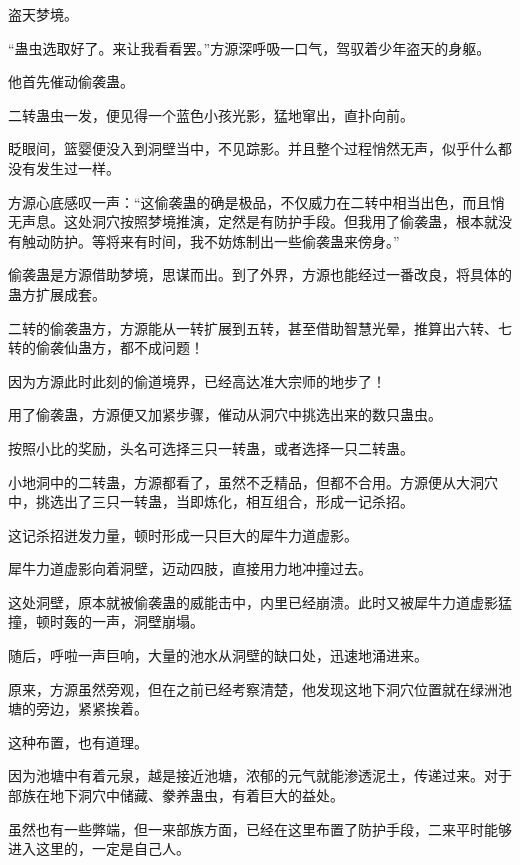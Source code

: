 
\begin{this_body}

盗天梦境。

“蛊虫选取好了。来让我看看罢。”方源深呼吸一口气，驾驭着少年盗天的身躯。

他首先催动偷袭蛊。

二转蛊虫一发，便见得一个蓝色小孩光影，猛地窜出，直扑向前。

眨眼间，篮婴便没入到洞壁当中，不见踪影。并且整个过程悄然无声，似乎什么都没有发生过一样。

方源心底感叹一声：“这偷袭蛊的确是极品，不仅威力在二转中相当出色，而且悄无声息。这处洞穴按照梦境推演，定然是有防护手段。但我用了偷袭蛊，根本就没有触动防护。等将来有时间，我不妨炼制出一些偷袭蛊来傍身。”

偷袭蛊是方源借助梦境，思谋而出。到了外界，方源也能经过一番改良，将具体的蛊方扩展成套。

二转的偷袭蛊方，方源能从一转扩展到五转，甚至借助智慧光晕，推算出六转、七转的偷袭仙蛊方，都不成问题！

因为方源此时此刻的偷道境界，已经高达准大宗师的地步了！

用了偷袭蛊，方源便又加紧步骤，催动从洞穴中挑选出来的数只蛊虫。

按照小比的奖励，头名可选择三只一转蛊，或者选择一只二转蛊。

小地洞中的二转蛊，方源都看了，虽然不乏精品，但都不合用。方源便从大洞穴中，挑选出了三只一转蛊，当即炼化，相互组合，形成一记杀招。

这记杀招迸发力量，顿时形成一只巨大的犀牛力道虚影。

犀牛力道虚影向着洞壁，迈动四肢，直接用力地冲撞过去。

这处洞壁，原本就被偷袭蛊的威能击中，内里已经崩溃。此时又被犀牛力道虚影猛撞，顿时轰的一声，洞壁崩塌。

随后，呼啦一声巨响，大量的池水从洞壁的缺口处，迅速地涌进来。

原来，方源虽然旁观，但在之前已经考察清楚，他发现这地下洞穴位置就在绿洲池塘的旁边，紧紧挨着。

这种布置，也有道理。

因为池塘中有着元泉，越是接近池塘，浓郁的元气就能渗透泥土，传递过来。对于部族在地下洞穴中储藏、豢养蛊虫，有着巨大的益处。

虽然也有一些弊端，但一来部族方面，已经在这里布置了防护手段，二来平时能够进入这里的，一定是自己人。


\end{this_body}
